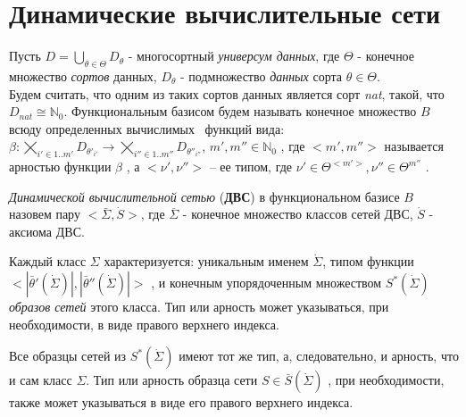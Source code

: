\section{Динамические вычислительные сети}
Пусть 
$ D = \displaystyle\bigcup_{\theta\in\Theta} D_\theta $  - многосортный \textit{универсум данных},  
где $\Theta$ - конечное множество \textit{сортов} данных, 
$D_\theta$ - подмножество \textit{данных} сорта $\theta\in\Theta$.\\
Будем считать, что одним из таких сортов данных является сорт \textit{nat}, такой, что $D_{\textit{nat}} \cong \mathbb{N}_0$.
Функциональным базисом будем называть конечное множество  $ B $   всюду определенных вычислимых~\cite{falkTheory} функций вида:\\
$ \beta: \displaystyle\bigtimes_{i'\in 1..m'}D_{\theta'_{i'}} \rightarrow \displaystyle\bigtimes_{i''\in 1..m''}D_{\theta''_{i''}} $, $ m', m'' \in \mathbb{N}_0 $  , 
где  $ <m', m''> $   называется арностью функции $ \beta $  , а  $ <\nu', \nu''> $ -- ее типом, где $ \nu'\in \Theta^{<m'>}, \nu''\in \Theta^{m''} $
.

\textit{ Динамической вычислительной сетью} (\textbf{ДВС}) в функциональном базисе $B$ 
назовем пару $<\bar{\Sigma}, \dot{S}>$, где $\overline{\Sigma}$ 
- конечное множество классов сетей ДВС, $\dot{S}$ - аксиома ДВС.

Каждый класс $\Sigma$ характеризуется: 
уникальным именем  $\dot{\Sigma}$, 
типом функции 
$< |\bar{\theta}'(\dot{\Sigma})|, |\bar{\theta}''(\dot{\Sigma})|>$
,  и конечным упорядоченным множеством $S^*(\dot{\Sigma})$
\textit{образов сетей} этого класса.
Тип или арность может указываться,
при необходимости, в виде правого верхнего индекса.

Все образцы сетей из $S^*(\dot{\Sigma})$ имеют тот же тип, а, следовательно,
и арность, что и сам класс $\Sigma$.
Тип или арность образца сети   $S\in\bar{S}(\dot{\Sigma})$ ,
при необходимости, также может указываться в виде его правого верхнего индекса.

